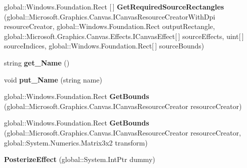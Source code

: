 \begin{DoxyCompactItemize}
global\+::\+Windows.\+Foundation.\+Rect \mbox{[}$\,$\mbox{]} {\bfseries Get\+Required\+Source\+Rectangles} (global\+::\+Microsoft.\+Graphics.\+Canvas.\+I\+Canvas\+Resource\+Creator\+With\+Dpi resource\+Creator, global\+::\+Windows.\+Foundation.\+Rect output\+Rectangle, global\+::\+Microsoft.\+Graphics.\+Canvas.\+Effects.\+I\+Canvas\+Effect\mbox{[}$\,$\mbox{]} source\+Effects, uint\mbox{[}$\,$\mbox{]} source\+Indices, global\+::\+Windows.\+Foundation.\+Rect\mbox{[}$\,$\mbox{]} source\+Bounds)
\item 
\mbox{\label{class_microsoft_1_1_graphics_1_1_canvas_1_1_effects_1_1_posterize_effect_a90d96f718b47b60dd8d6610f8dd5a914}} 
string {\bfseries get\+\_\+\+Name} ()
\item 
\mbox{\label{class_microsoft_1_1_graphics_1_1_canvas_1_1_effects_1_1_posterize_effect_aec9c01e0c6c4a1251a240c48fc869d0b}} 
void {\bfseries put\+\_\+\+Name} (string name)
\item 
\mbox{\label{class_microsoft_1_1_graphics_1_1_canvas_1_1_effects_1_1_posterize_effect_a780eb4ebaf96658240c725e269e4d9ec}} 
global\+::\+Windows.\+Foundation.\+Rect {\bfseries Get\+Bounds} (global\+::\+Microsoft.\+Graphics.\+Canvas.\+I\+Canvas\+Resource\+Creator resource\+Creator)
\item 
\mbox{\label{class_microsoft_1_1_graphics_1_1_canvas_1_1_effects_1_1_posterize_effect_a4ee2f237bc1b5167fcc5df95e29965cc}} 
global\+::\+Windows.\+Foundation.\+Rect {\bfseries Get\+Bounds} (global\+::\+Microsoft.\+Graphics.\+Canvas.\+I\+Canvas\+Resource\+Creator resource\+Creator, global\+::\+System.\+Numerics.\+Matrix3x2 transform)
\item 
\mbox{\label{class_microsoft_1_1_graphics_1_1_canvas_1_1_effects_1_1_posterize_effect_adb521c0c91dea5df611cb2166a550e59}} 
{\bfseries Posterize\+Effect} (global\+::\+System.\+Int\+Ptr dummy)
\item 
\mbox{\label{class_microsoft_1_1_graphics_1_1_canvas_1_1_effects_1_1_posterize_effect_a40d8d73e8cddc900834ed4ad7b805aec}} 

\end{DoxyCompactItemize}
